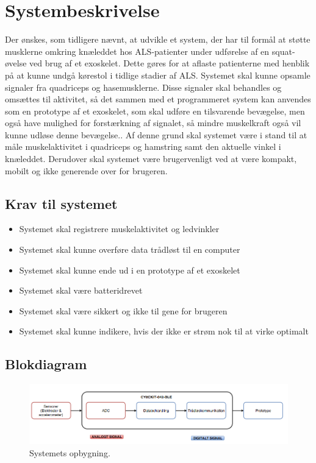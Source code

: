 \section{Systembeskrivelse}
Der ønskes, som tidligere nævnt, at udvikle et system, der har til formål at støtte musklerne omkring knæleddet hos ALS-patienter under udførelse af en squat-øvelse ved brug af et exoskelet. Dette gøres for at aflaste patienterne med henblik på at kunne undgå kørestol i tidlige stadier af ALS. Systemet skal kunne opsamle signaler fra quadriceps og hasemusklerne. Disse signaler skal behandles og omsættes til aktivitet, så det sammen med et programmeret system kan anvendes som en prototype af et exoskelet, som skal udføre en tilsvarende bevægelse, men også have mulighed for forstærkning af signalet, så mindre muskelkraft også vil kunne udløse denne bevægelse.. Af denne grund skal systemet være i stand til at måle muskelaktivitet i quadriceps og hamstring samt den aktuelle vinkel i knæleddet. Derudover skal systemet være brugervenligt ved at være kompakt, mobilt og ikke generende over for brugeren.

\subsection{Krav til systemet} 
\begin{itemize}
\item Systemet skal registrere muskelaktivitet og ledvinkler
\item Systemet skal kunne overføre data trådløst til en computer
\item Systemet skal kunne ende ud i en prototype af et exoskelet
\item Systemet skal være batteridrevet
\item Systemet skal være sikkert og ikke til gene for brugeren
\item Systemet skal kunne indikere, hvis der ikke er strøm nok til at virke optimalt
\end{itemize}


\subsection{Blokdiagram}
\begin{figure}[H]
\centering
\includegraphics[width=1\textwidth]{figures/blokdiagram.png}
\caption{Systemets opbygning.}
\label{fig:blokdiagram}
\end{figure}

